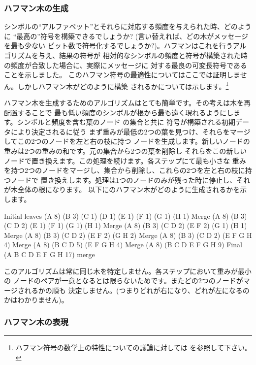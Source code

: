 \subsubsection*{ハフマン木の生成}


シンボルの``アルファベット''とそれらに対応する頻度を与えられた時、どのように
``最高の''符号を構築できるでしょうか? (言い替えれば、どの木がメッセージを最も少ない
ビット数で符号化するでしょうか?)。ハフマンはこれを行うアルゴリズムを与え、結果の符号が
相対的なシンボルの頻度と符号が構築された時の頻度が合致した場合に、実際にメッセージに
対する最良の可変長符号であることを示しました。
このハフマン符号の最適性についてはここでは証明しません。しかしハフマン木がどのように構築
されるかについては示します。\footnote{ハフマン符号の数学上の特性についての議論に対しては
を参照して下さい。}


ハフマン木を生成するためのアルゴリズムはとても簡単です。その考えは木を再配置することで
最も低い頻度のシンボルが根から最も遠く現れるようにします。シンボルと頻度を含む葉のノード
の集合と共に
符号が構築される初期データにより決定されるに従う
まず重みが最低の2つの葉を見つけ、それらをマージしてこの2つのノードを左と右の枝に持つ
ノードを生成します。新しいノードの重みは2つの重みの和です。元の集合から2つの葉を削除し
それらをこの新しいノードで置き換えます。この処理を続けます。各ステップにて最も小さな
重みを持つ2つのノードをマージし、集合から削除し、これらの2つを左と右の枝に持つノードで
置き換えします。処理は1つのノードのみが残った時に停止し、それが木全体の根になります。
以下にのハフマン木がどのように生成されるかを示します。

\begin{example}
Initial  
leaves   {(A 8) (B 3) (C 1) (D 1) (E 1) (F 1) (G 1) (H 1)}
Merge    {(A 8) (B 3) ({C D} 2) (E 1) (F 1) (G 1) (H 1)}
Merge    {(A 8) (B 3) ({C D} 2) ({E F} 2) (G 1) (H 1)}
Merge    {(A 8) (B 3) ({C D} 2) ({E F} 2) ({G H} 2)}
Merge    {(A 8) (B 3) ({C D} 2) ({E F G H} 4)}
Merge    {(A 8) ({B C D} 5) ({E F G H} 4)}
Merge    {(A 8) ({B C D E F G H} 9)}
Final    {({A B C D E F G H} 17)}
merge
\end{example}

\noindent
このアルゴリズムは常に同じ木を特定しません。各ステップにおいて重みが最小の
ノードのペアが一意となるとは限らないためです。またどの2つのノードがマージされるかの順も
決定しません。(つまりどれが右になり、どれが左になるのかはわかりません)。

\subsubsection*{ハフマン木の表現}


